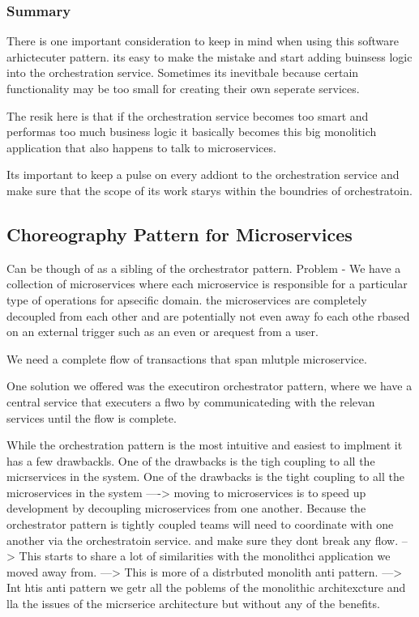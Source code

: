 \documentclass[a4paper, 11pt]{book}
\begin{document}
{    \subsubsection{Summary}
    There is one important consideration to keep in mind when using this software arhictecuter pattern.
    its easy to make the mistake and start adding buinsess logic into the orchestration service.
    Sometimes its inevitbale because certain functionality may be too small for creating their own seperate services.

    The resik here is that if the orchestration service becomes too smart and performas too much business logic it basically becomes this big monolitich application that also happens to talk to microservices.

    Its important to keep a pulse on every addiont to the orchestration service and make sure that the scope of its work starys within the boundries of orchestratoin.

    \subsection{Choreography Pattern for Microservices}
    Can be though of as a sibling of the orchestrator pattern.
    Problem - We have a collection of microservices where each microservice is responsible for a particular type of operations for apsecific domain.
    the microservices are completely decoupled from each other and are potentially not even away fo each othe rbased on an external trigger such as an even or arequest from a user.

    We need a complete flow of transactions that span mlutple microservice.

    One solution we offered was the executiron orchestrator pattern, where we have a central service that executers a flwo by communicateding with the relevan services until the flow is complete.

    While the orchestration pattern is the most intuitive and easiest to implment it has a few drawbackls.
    One of the drawbacks is the tigh coupling to all the micrservices in the system.
    One of the drawbacks is the tight coupling to all the microservices in the system
    ----> moving to microservices is to speed up development by decoupling microservices from one another.
    Because the orchestrator pattern is tightly coupled teams will need to coordinate with one another via the orchestratoin service. and make sure they dont break any flow.
    --> This starts to share a lot of similarities with the monolithci application we moved away from.
    ---> This is more of a distrbuted monolith anti pattern.
    ---> Int htis anti pattern we getr all the poblems of the monolithic architexcture and lla the issues of the micrserice architecture but without any of the benefits.

}
\end{document}
